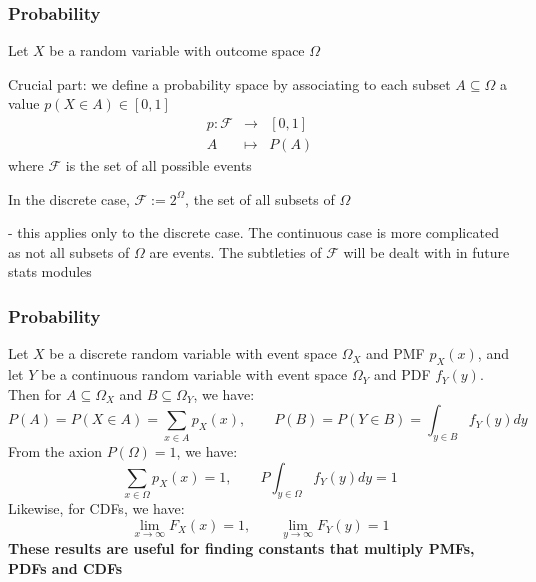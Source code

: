 \documentclass[t,8pt]{beamer}%
\begin{document}
	\begin{frame}
		\frametitle{Probability}
		Let $X$ be a random variable with outcome space $\Omega$ \par
		Crucial part: we define a probability space by associating to each subset $A\subseteq\Omega$ a value $p(X\in A)\in[0,1]$
		\begin{eqnarray*}
			p:\mathcal F&\rightarrow&[0,1]\\
			A&\mapsto&P(A)
		\end{eqnarray*}
		where $\mathcal F$ is the set of all possible events \par
		In the discrete case, $\mathcal F:=2^{\Omega}$, the set of all subsets of $\Omega$ \par
		{\small\color{NavyBlue} - this applies only to the discrete case. The continuous case is more complicated as not all subsets of $\Omega$ are events. The subtleties of $\mathcal F$ will be dealt with in future stats modules} \par
	\end{frame}

	\begin{frame}
		\frametitle{Probability}
        Let $X$ be a discrete random variable with event space $\Omega_X$ and PMF $p_X(x)$, and let $Y$ be a continuous random variable with event space $\Omega_Y$ and PDF $f_Y(y)$. Then for $A\subseteq\Omega_X$ and $B\subseteq\Omega_Y$, we have:
        $$P(A)=P(X\in A)=\sum_{x\in A}p_X(x),\qquad P(B)=P(Y\in B)=\int_{y\in B}f_Y(y)dy$$
        From the axion $P(\Omega)=1$, we have:
        $$\sum_{x\in \Omega}p_X(x)=1,\qquad P\int_{y\in \Omega}f_Y(y)dy=1$$
        Likewise, for CDFs, we have:
        $$\lim_{x\rightarrow\infty}F_X(x)=1,\qquad \lim_{y\rightarrow\infty}F_Y(y)=1$$
        {\bf These results are useful for finding constants that multiply PMFs, PDFs and CDFs}
	\end{frame}
	
\end{document}

